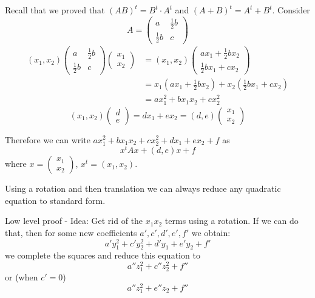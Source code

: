 \documentclass[10pt]{scrartcl}
\begin{document}
Recall that we proved that $(AB)^t = B^t\cdot A^t$ and  $(A+B)^t = A^t + B^t$. 
Consider \[
    A = \begin{pmatrix}
  	a & \frac{1}{2}b \\ \frac{1}{2}b & c
  \end{pmatrix}
\]
\begin{align*}
  (x_1,x_2)\begin{pmatrix}
  	a & \frac{1}{2}b \\ \frac{1}{2}b & c
  \end{pmatrix}\begin{pmatrix}
	x_1 \\ x_2	
	\end{pmatrix}
	&= (x_1,x_2)\begin{pmatrix}
ax_1 + \frac{1}{2}bx_2 \\
\frac{1}{2}bx_1 + cx_2	
\end{pmatrix}\\[.2cm]
&= x_1(ax_1 + \textstyle{\frac{1}{2}}bx_2) + x_2(\textstyle{\frac{1}{2}}bx_1 + cx_2)\\[.2cm]
&= ax_1^2 + bx_1x_2 + cx_2^2
\end{align*}
\[
  (x_1,x_2) \begin{pmatrix}
 d \\ e	
 \end{pmatrix} = dx_1 + ex_2 = (d,e) \begin{pmatrix}
 x_1 \\ x_2	
 \end{pmatrix}
\]


Therefore we can write $ax_1^2 + bx_1x_2 + cx_2^2 + dx_1 + ex_2 + f$ as 
\[
  x^tAx + (d,e)x + f
\]
where $x = \begin{pmatrix}
 x_1 \\ x_2	
 \end{pmatrix}$, $x^t = (x_1,x_2)$.\\
 
 
\begin{theorem}
 Using a  rotation and then translation we can always reduce any quadratic equation to standard form. 	
\end{theorem}

Low level proof - Idea: Get rid of the $x_1x_2$ terms using a rotation. If we can do that, then for some new coefficients $a',c',d',e',f'$ we obtain:
\[
  a'y_1^2 + c'y_2^2 + d'y_1 + e'y_2 + f'
\]
we complete the squares and reduce this equation to 
\[
  a''z_1^2 + c''z_2^2 + f''
\]
or (when $c' = 0$)
\[
  a''z_1^2 + e''z_2 + f'' 
\]
\end{document}
